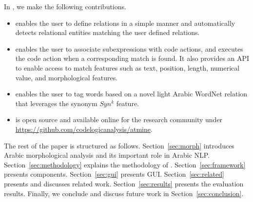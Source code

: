 In \framework, we make the following contributions.
\begin{itemize}
  \item \framework enables the user to define relations in a simple manner
    and automatically detects relational entities matching the user defined relations. 
  \item \framework enables the user to associate subexpressions
    with code actions, and executes the code action 
    when a corresponding match is found.
    It also provides an API to enable access to match 
    features such as text, position, length, numerical value, and morphological features.
  \item \framework enables the user to tag words based on a novel light Arabic WordNet relation that leverages the synonym $Syn^k$ feature.
  \item \framework is open source and available online for the research community 
    under \url{https://github.com/codelogicanalysis/atmine}.
\end{itemize}

The rest of the paper is structured as follows.
Section~\ref{sec:morph} introduces Arabic morphological analysis 
and its important role in Arabic NLP.
Section~\ref{sec:methodology} explains the methodology of \framework.
Section~\ref{sec:framework} presents \framework components.
Section~\ref{sec:gui} presents \framework GUI. 
Section~\ref{sec:related} presents and discusses related work.
Section~\ref{sec:results} presents the evaluation results. 
Finally, we conclude and discuss future work in Section~\ref{sec:conclusion}.